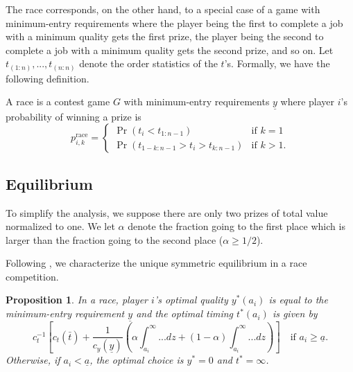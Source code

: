 \documentclass[12pt,]{article}
\newtheorem{proposition}{Proposition}
\newcommand\deadline{\bar{t}}
\newcommand\target{\underline{y}}
\newcommand\race{\text{race}}
\newcommand\ctime{c_{t}}
\newcommand\cscore{c_{y}}
\newcommand\mtype{\underline{a}}
\begin{document}
The race corresponds, on the other hand, to a special case of a game
with minimum-entry requirements where the player being the first to
complete a job with a minimum quality gets the first prize, the player
being the second to complete a job with a minimum quality gets the
second prize, and so on. Let \(t_{(1:n)}, ..., t_{(n:n)}\) denote the
order statistics of the \(t\)'s. Formally, we have the following
definition.

\begin{definition}
A race is a contest game $G$ with minimum-entry requirements $\target$ where player $i$'s probability of winning a prize is
\begin{equation}
  p_{i, k}^\race =
  \begin{cases}
    \Pr(t_i < t_{1:n-1}) & \text{if }k=1\\
    \Pr(t_{1-k:n-1} > t_i > t_{k:n-1}) & \text{if }k>1.
  \end{cases}
\end{equation}
\end{definition}

\subsection{Equilibrium}\label{equilibrium}

To simplify the analysis, we suppose there are only two prizes of total
value normalized to one. We let \(\alpha\) denote the fraction going to
the first place which is larger than the fraction going to the second
place (\(\alpha\geq1/2\)).

Following \citet{moldovanu2001optimal}, we characterize the unique
symmetric equilibrium in a race competition.

\begin{proposition}
In a race, player $i$'s optimal quality $y^*(a_i)$ is equal to the minimum-entry requirement $\target$ and the optimal timing $t^*(a_i)$ is given by
\begin{equation} 
  \label{eq: optimal time race}
  \ctime^{-1}
  \left[
    \ctime(\deadline) 
    + \frac{1}{\cscore(\target)}\left(
      \alpha \int_{a_i}^{\infty} ... dz
      + (1-\alpha) \int_{a_i}^{\infty} ...  dz
    \right)
  \right]
  \quad \text{if }a_i \geq \mtype.
\end{equation}
Otherwise, if $a_i < \mtype$, the optimal choice is $y^*=0$ and $t^*=\infty$.
\end{proposition}
\end{document}
